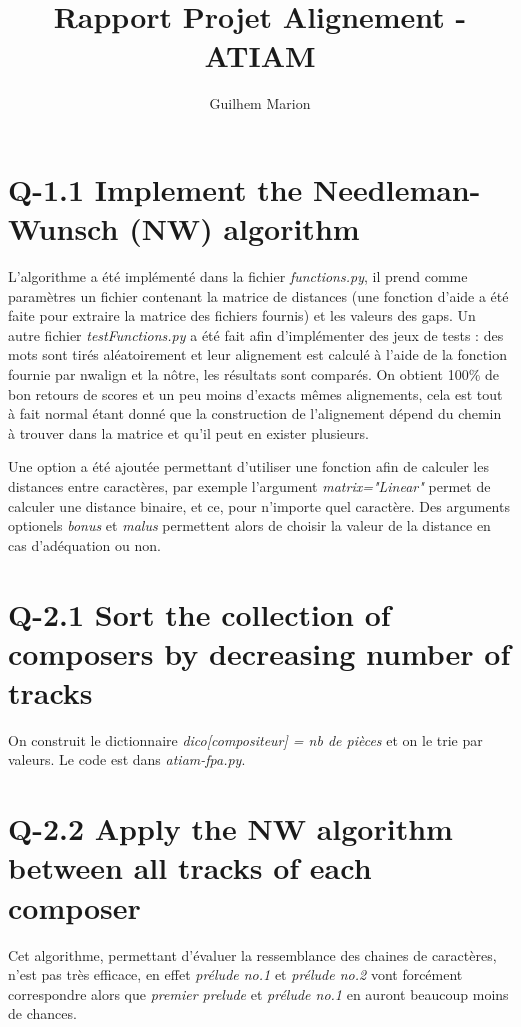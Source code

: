 \documentclass[10.5pt, oneside]{article}   	%
\title{Rapport Projet Alignement - ATIAM}
\author{Guilhem Marion}
\begin{document}
\maketitle

\section{Q-1.1 Implement the Needleman-Wunsch (NW) algorithm}

L'algorithme a été implémenté dans la fichier \textit{functions.py}, il prend comme paramètres un fichier contenant la matrice de distances (une fonction d'aide a été faite pour extraire la matrice des fichiers fournis) et les valeurs des gaps. Un autre fichier \textit{testFunctions.py} a été fait afin d'implémenter des jeux de tests : des mots sont tirés aléatoirement et leur alignement est calculé à l'aide de la fonction fournie par nwalign et la nôtre, les résultats sont comparés. On obtient 100\% de bon retours de scores et un peu moins d'exacts mêmes alignements, cela est tout à fait normal étant donné que la construction de l'alignement dépend du chemin à trouver dans la matrice et qu'il peut en exister plusieurs. 

Une option a été ajoutée permettant d'utiliser une fonction afin de calculer les distances entre caractères, par exemple l'argument \textit{matrix="Linear"} permet de calculer une distance binaire, et ce, pour n'importe quel caractère. Des arguments optionels \textit{bonus} et \textit{malus} permettent alors de choisir la valeur de la distance en cas d'adéquation ou non.

\section{Q-2.1 Sort the collection of composers by decreasing number of tracks}

On construit le dictionnaire \textit{dico[compositeur] = nb de pièces} et on le trie par valeurs. Le code est dans \textit{atiam-fpa.py}.

\section{Q-2.2 Apply the NW algorithm between all tracks of each composer}

Cet algorithme, permettant d'évaluer la ressemblance des chaines de caractères, n'est pas très efficace, en effet \textit{prélude no.1} et \textit{prélude no.2} vont forcément correspondre alors que \textit{premier prelude} et \textit{prélude no.1} en auront beaucoup moins de chances.
\end{document}
